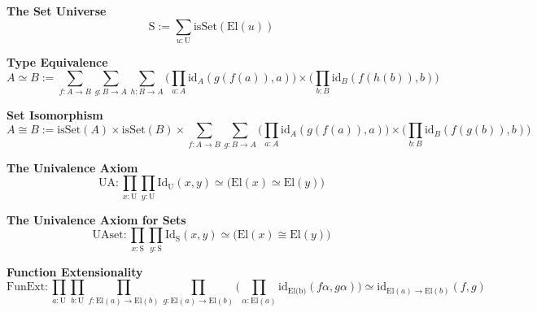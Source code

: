 \textbf{The Set Universe}
$$\text{S} := \sum_{u : \text{U}} \text{isSet}(\text{El}(u))$$

\textbf{Type Equivalence}
$$A \simeq B := \sum_{f :A \to B}\sum_{g :B \to A}\sum_{h :B \to A}\Big(\prod_{a : A} \text{id}_{A}(g(f(a)),a) \Big) \times \Big(\prod_{b : B} \text{id}_{B}(f(h(b)),b) \Big)$$

\textbf{Set Isomorphism}
$$A \cong B := \text{isSet}(A) \times \text{isSet}(B)\times\sum_{f :A \to B}\sum_{g :B \to A}\Big(\prod_{a : A} \text{id}_{A}(g(f(a)),a) \Big) \times \Big(\prod_{b : B} \text{id}_{B}(f(g(b)),b) \Big)$$

\textbf{The Univalence Axiom}
$$\text{UA}: \prod_{x : \text{U}} \prod_{y : \text{U}} \text{Id}_{\text{U}}(x,y) \simeq \Big(\text{El}(x) \simeq \text{El}(y)\Big)$$

\textbf{The Univalence Axiom for Sets}
$$\text{UAset}: \prod_{x : \text{S}} \prod_{y : \text{S}} \text{Id}_{\text{S}}(x,y) \simeq \Big(\text{El}(x) \cong \text{El}(y)\Big)$$

\textbf{Function Extensionality}
$$\text{FunExt}: \prod_{a : \text{U}} \prod_{b : \text{U}} \prod_{f : \text{El}(a) \to \text{El}(b)} \prod_{g : \text{El}(a) \to \text{El}(b)}\Big( \prod_{\alpha : \text{El}(a)}\text{id}_{\text{El(b)}}(f\alpha,g\alpha)\Big) \simeq \text{id}_{\text{El}(a) \to \text{El}(b)}(f,g)$$
